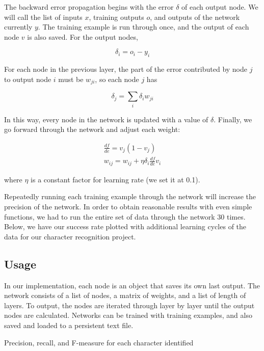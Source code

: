 \documentclass[11pt,a4paper]{article}
\begin{document}
The backward error propagation begins with the error $\delta$ of each output node. We will call the list of inputs $x$, training outputs $o$, and outputs of the network currently $y$. The training example is run through once, and the output of each node $v$ is also saved. For the output nodes,

\[
\delta_i = o_i - y_i
\]

\begin{table}
\vspace{-120px}
\end{table}

For each node in the previous layer, the part of the error contributed by node $j$ to output node $i$ must be $w_{ji}$, so each node $j$ has

\[
\delta_j = \sum_i{\delta_i w_{ji}}
\]

In this way, every node in the network is updated with a value of $\delta$. Finally, we go forward through the network and adjust each weight:

\begin{gather*}
\frac{df}{de} = v_j (1 - v_j) \\
w_{ij} = w_{ij} + \eta \delta_i \frac{df}{de}v_i
\end{gather*}

where $\eta$ is a constant factor for learning rate (we set it at 0.1).

Repeatedly running each training example through the network will increase the precision of the network. In order to obtain reasonable results with even simple functions, we had to run the entire set of data through the network 30 times. Below, we have our success rate plotted with additional learning cycles of the data for our character recognition project.

\subsection{Usage} 
\label{Artificial Neural Nets:Usage}

In our implementation, each node is an object that saves its own last output. The network consists of a list of nodes, a matrix of weights, and a list of length of layers. To output, the nodes are iterated through layer by layer until the output nodes are calculated. Networks can be trained with training examples, and also saved and loaded to a persistent text file.

\begin{table}
\vspace{-20px}
\caption{Precision, recall, and F-measure for each character identified}
\vspace{-70px}
\end{table}
\end{document}
